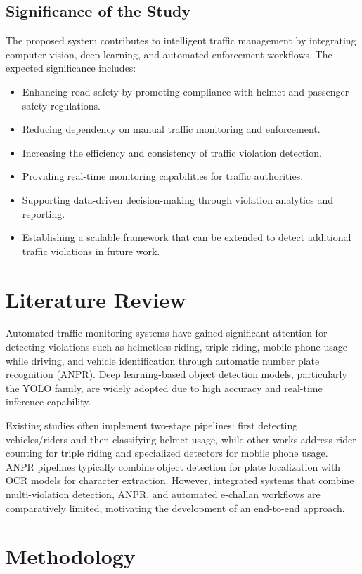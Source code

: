 \documentclass[12pt,a4paper]{article}
\begin{document}
\subsection{Significance of the Study}
The proposed system contributes to intelligent traffic management by integrating computer vision, deep learning, and automated enforcement workflows. The expected significance includes:
\begin{itemize}
  \item Enhancing road safety by promoting compliance with helmet and passenger safety regulations.
  \item Reducing dependency on manual traffic monitoring and enforcement.
  \item Increasing the efficiency and consistency of traffic violation detection.
  \item Providing real-time monitoring capabilities for traffic authorities.
  \item Supporting data-driven decision-making through violation analytics and reporting.
  \item Establishing a scalable framework that can be extended to detect additional traffic violations in future work.
\end{itemize}

\section{Literature Review}
Automated traffic monitoring systems have gained significant attention for detecting violations such as helmetless riding, triple riding, mobile phone usage while driving, and vehicle identification through automatic number plate recognition (ANPR). Deep learning-based object detection models, particularly the YOLO family, are widely adopted due to high accuracy and real-time inference capability.

Existing studies often implement two-stage pipelines: first detecting vehicles/riders and then classifying helmet usage, while other works address rider counting for triple riding and specialized detectors for mobile phone usage. ANPR pipelines typically combine object detection for plate localization with OCR models for character extraction. However, integrated systems that combine multi-violation detection, ANPR, and automated e-challan workflows are comparatively limited, motivating the development of an end-to-end approach.

\section{Methodology}
\end{document}
